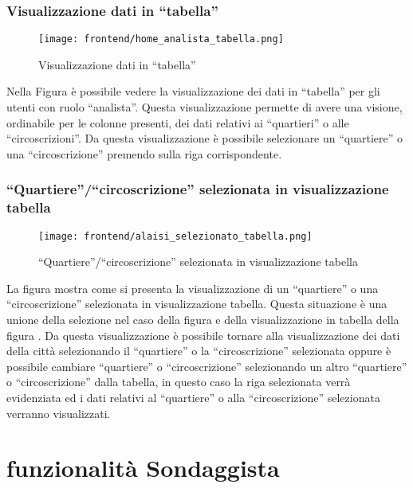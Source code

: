     \subsubsection{Visualizzazione dati in ``tabella''}
        \begin{figure}[H]
            \centering
            \texttt{[image: frontend/home\_analista\_tabella.png]}
            \caption{Visualizzazione dati in ``tabella''}
            \label{fig:frontend-analista-tabella}
        \end{figure}
        Nella Figura  è possibile vedere la visualizzazione dei dati in ``tabella'' per gli utenti con ruolo ``analista''. Questa visualizzazione permette di avere una visione, ordinabile per le colonne presenti, dei dati relativi ai ``quartieri'' o alle ``circoscrizioni''. Da questa visualizzazione è possibile selezionare un ``quartiere'' o una ``circoscrizione'' premendo sulla riga corrispondente. 
    \subsubsection{``Quartiere''/``circoscrizione'' selezionata in visualizzazione tabella}
        \begin{figure}[H]
            \centering
            \texttt{[image: frontend/alaisi\_selezionato\_tabella.png]}
            \caption{``Quartiere''/``circoscrizione'' selezionata in visualizzazione tabella}
            \label{fig:frontend-analista-tabella-selezionato}
        \end{figure}
        La figura  mostra come si presenta la visualizzazione di un ``quartiere'' o una ``circoscrizione'' selezionata in visualizzazione tabella. Questa situazione è una unione della selezione nel caso della figura  e della visualizzazione in tabella della figura . Da questa visualizzazione è possibile tornare alla visualizzazione dei dati della città selezionando il ``quartiere'' o la ``circoscrizione'' selezionata oppure è possibile cambiare ``quartiere'' o ``circoscrizione'' selezionando un altro ``quartiere'' o ``circoscrizione'' dalla tabella, in questo caso la riga selezionata verrà evidenziata ed i dati relativi al ``quartiere'' o alla ``circoscrizione'' selezionata verranno visualizzati.
\section{funzionalità Sondaggista}